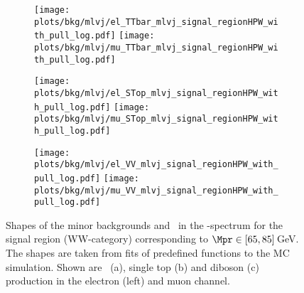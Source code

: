 \begin{figure}
	\centering
	\begin{subfigure}{0.8\textwidth}
		\texttt{[image: plots/bkg/mlvj/el\_TTbar\_mlvj\_signal\_regionHPW\_with\_pull\_log.pdf]}		
		\texttt{[image: plots/bkg/mlvj/mu\_TTbar\_mlvj\_signal\_regionHPW\_with\_pull\_log.pdf]}		
		\caption{}
	\end{subfigure}
	\begin{subfigure}{0.8\textwidth}
		\texttt{[image: plots/bkg/mlvj/el\_STop\_mlvj\_signal\_regionHPW\_with\_pull\_log.pdf]}
		\texttt{[image: plots/bkg/mlvj/mu\_STop\_mlvj\_signal\_regionHPW\_with\_pull\_log.pdf]}	
		\caption{}	
	\end{subfigure}
	\begin{subfigure}{0.8\textwidth}
		\texttt{[image: plots/bkg/mlvj/el\_VV\_mlvj\_signal\_regionHPW\_with\_pull\_log.pdf]}
		\texttt{[image: plots/bkg/mlvj/mu\_VV\_mlvj\_signal\_regionHPW\_with\_pull\_log.pdf]}
		\caption{}
	\end{subfigure}	
	\caption[Shapes of the minor backgrounds and \ttbar \ in the \MWV -spectrum for the signal region (WW-category)]{Shapes of the minor backgrounds and \ttbar \ in the \MWV -spectrum for the signal region (WW-category) corresponding to $\Mpr \in [65,85]$\,GeV. The shapes are taken from fits of predefined functions to the MC simulation. Shown are \ttbar \ (a), single top (b) and diboson (c) production in the electron (left) and muon channel.}
	\label{fig:app:mwv_sig_minor_WW}
\end{figure}

